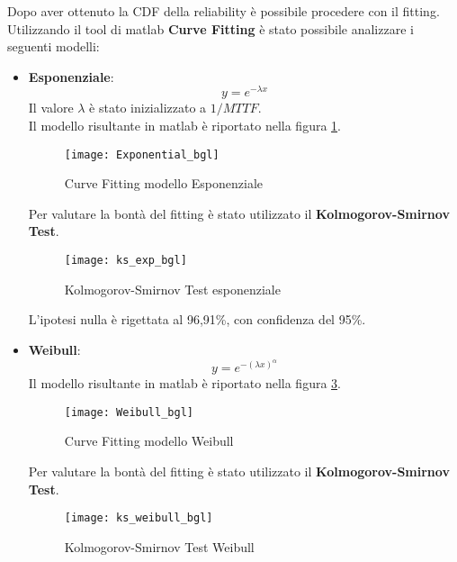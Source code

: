 Dopo aver ottenuto la CDF della reliability è possibile procedere con il fitting.\\
Utilizzando il tool di matlab \textbf{Curve Fitting} è stato possibile
analizzare i seguenti modelli:

\clearpage

\begin{itemize}
  \item \textbf{Esponenziale}:
  $$ y = e^{- \lambda  x} $$
  Il valore $\lambda$ è stato inizializzato a $1/MTTF$.\\
  Il modello risultante in matlab è riportato nella figura \ref{Exponential_bgl}.\\

  \begin{figure}[!htbp]
    \texttt{[image: Exponential\_bgl]}
    \caption{Curve Fitting modello Esponenziale}
    \label{Exponential_bgl}
  \end{figure}

  Per valutare la bontà del fitting è stato utilizzato il \textbf{Kolmogorov-Smirnov Test}.\\

  \begin{figure}[!htbp]
    \centering
    \texttt{[image: ks\_exp\_bgl]}
    \caption{Kolmogorov-Smirnov Test esponenziale}
    \label{ks_exp_bgl}
  \end{figure}

  L'ipotesi nulla è rigettata al 96,91\%, con confidenza del 95\%.

  \clearpage

  \item \textbf{Weibull}:
  $$ y = e^{- (\lambda x)^\alpha} $$
  Il modello risultante in matlab è riportato nella figura \ref{Weibull_bgl}.\\
  \begin{figure}[!htbp]
    \centering
    \texttt{[image: Weibull\_bgl]}
    \caption{Curve Fitting modello Weibull}
    \label{Weibull_bgl}
  \end{figure}

  Per valutare la bontà del fitting è stato utilizzato il \textbf{Kolmogorov-Smirnov Test}.\\

  \begin{figure}[!htbp]
    \centering
    \texttt{[image: ks\_weibull\_bgl]}
    \caption{Kolmogorov-Smirnov Test Weibull}
    \label{ks_weibull_bgl}
  \end{figure}


\end{itemize}
